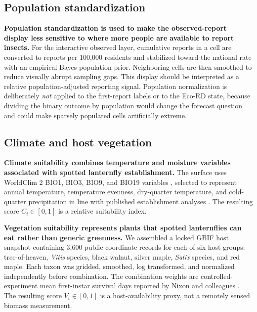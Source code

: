 \documentclass{article}
\begin{document}
\subsection{Population standardization}

\textbf{Population standardization is used to make the observed-report display less sensitive to where more people are available to report insects.} For the interactive observed layer, cumulative reports in a cell are converted to reports per 100,000 residents and stabilized toward the national rate with an empirical-Bayes population prior. Neighboring cells are then smoothed to reduce visually abrupt sampling gaps. This display should be interpreted as a relative population-adjusted reporting signal. Population normalization is deliberately \emph{not} applied to the first-report labels or to the Eco-RD state, because dividing the binary outcome by population would change the forecast question and could make sparsely populated cells artificially extreme.

\subsection{Climate and host vegetation}

\textbf{Climate suitability combines temperature and moisture variables associated with spotted lanternfly establishment.} The surface uses WorldClim 2 BIO1, BIO3, BIO9, and BIO19 variables \cite{worldclim}, selected to represent annual temperature, temperature evenness, dry-quarter temperature, and cold-quarter precipitation in line with published establishment analyses \cite{wakie2020}. The resulting score $C_i\in[0,1]$ is a relative suitability index.

\textbf{Vegetation suitability represents plants that spotted lanternflies can eat rather than generic greenness.} We assembled a locked GBIF host snapshot containing 3,600 public-coordinate records for each of six host groups: tree-of-heaven, \textit{Vitis} species, black walnut, silver maple, \textit{Salix} species, and red maple. Each taxon was gridded, smoothed, log transformed, and normalized independently before combination. The combination weights are controlled-experiment mean first-instar survival days reported by Nixon and colleagues \cite{nixon2020}. The resulting score $V_i\in[0,1]$ is a host-availability proxy, not a remotely sensed biomass measurement.
\end{document}
